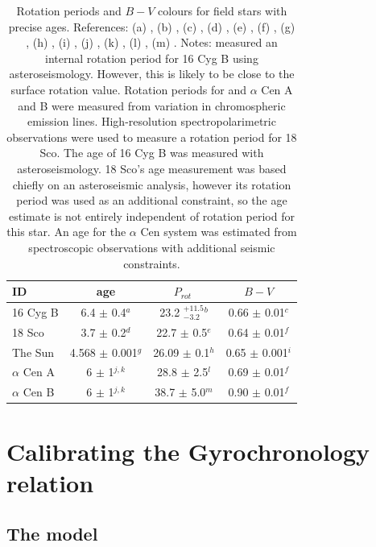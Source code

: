 \documentclass[useAMS, usenatbib]{mn2e}
\newcommand{\prot}{$P_{rot}~$}
\begin{document}
\begin{table}
\caption{Rotation periods and $B-V$ colours for field stars with precise
	ages. References: (a) \citet{Metcalfe2012}, (b) \citet{Davies2014}, (c)
\citet{Moffett1979}, (d) \citet{Li2012}, (e) \citet{Petit2008}, (f)
\citet{Mermilliod1986}, (g) \citet{Bouvier2010}, (h) \citet{Donahue1996}, (i)
\citet{Cox2000}, (j) \citet{Bazot2012}, (k) \citet{Yildiz2007}, (l)
\citet{Hallam1991}, (m) \citet{Dumusque2012}.
Notes: \citet{Davies2014} measured an internal rotation period for 16 Cyg B
using asteroseismology.
However, this is likely to be close to the surface rotation value.
Rotation periods for and $\alpha$ Cen A and B were measured
from variation in chromospheric emission lines.
High-resolution spectropolarimetric observations were used to measure
a rotation period for 18 Sco.
The age of 16 Cyg B was measured with asteroseismology.
18 Sco's age measurement was based chiefly on an asteroseismic analysis,
however its rotation period was used as an additional constraint, so the age
estimate is not entirely independent of rotation period for this star.
An age for the $\alpha$ Cen system was estimated from spectroscopic
observations with additional seismic constraints.\label{tab:field}}

\begin{tabular}{lccc}
\hline\hline
{ID} & {age} & {\prot} & {$B-V$} \\
\hline
16 Cyg B & 6.4 $\pm$ 0.4$^a$ & 23.2 $^{+11.5}_{-3.2}$$^b$ & 0.66 $\pm$ 0.01$^c$ \\
18 Sco & 3.7 $\pm$ 0.2$^d$ & 22.7 $\pm$ 0.5$^e$ & 0.64 $\pm$ 0.01$^f$ \\
The Sun & 4.568 $\pm$ 0.001$^g$ & 26.09 $\pm$ 0.1$^h$ & 0.65 $\pm$ 0.001$^i$ \\
$\alpha$ Cen A & 6 $\pm$ 1$^{j, k}$ & 28.8 $\pm$ 2.5$^{l}$ &
0.69 $\pm$ 0.01$^f$ \\
$\alpha$ Cen B & 6 $\pm$ 1$^{j, k}$ & 38.7 $\pm$ 5.0$^{m}$ &
0.90 $\pm$ 0.01$^f$ \\
\hline
\end{tabular}
\end{table}

\section{Calibrating the Gyrochronology relation}
\label{sec:gyro_cal}

\subsection{The model}
\end{document}
